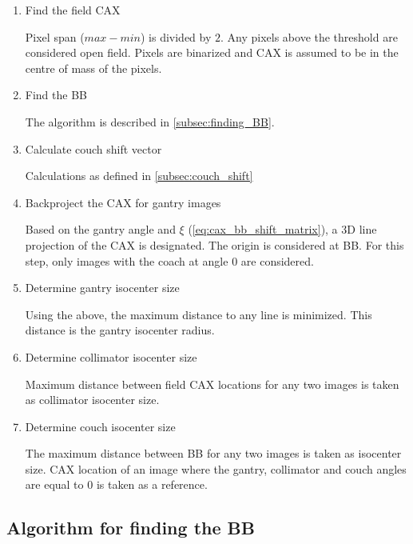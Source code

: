 \begin{enumerate}

    \item Find the field CAX

    Pixel span ($max - min$) is divided by $2$. Any pixels above the threshold are considered open field. Pixels are binarized and CAX is assumed to be in the centre of mass of the pixels.
    
    \item Find the BB

    The algorithm is described in \autoref{subsec:finding_BB}.
    
    \item Calculate couch shift vector

    Calculations as defined in \autoref{subsec:couch_shift}

    \item Backproject the CAX for gantry images

    Based on the gantry angle and $\xi$ (\autoref{eq:cax_bb_shift_matrix}), a 3D line projection of the CAX is designated. The origin is considered at BB. For this step, only images with the coach at angle 0 are considered.

    \item Determine gantry isocenter size

    Using the above, the maximum distance to any line is minimized. This distance is the gantry isocenter radius.

    \item Determine collimator isocenter size

    Maximum distance between field CAX locations for any two images is taken as collimator isocenter size.

    \item Determine couch isocenter size

    The maximum distance between BB for any two images is taken as isocenter size. CAX location of an image where the gantry, collimator and couch angles are equal to 0 is taken as a reference.
    
\end{enumerate}

\subsection{Algorithm for finding the BB} \label{subsec:finding_BB}

